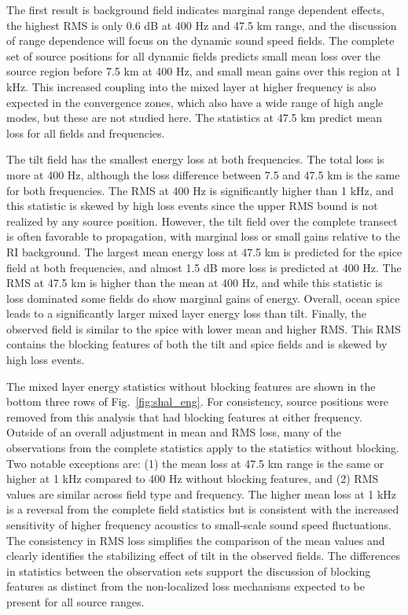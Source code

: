 \documentclass[preprint,NumberedRefs]{JASA}
\begin{document}
The first result is background field indicates marginal range dependent effects, the highest RMS is only 0.6 dB at 400 Hz and 47.5 km range, and the discussion of range dependence will focus on the dynamic sound speed fields. The complete set of source positions for all dynamic fields predicts small mean loss over the source region before 7.5 km at 400 Hz, and small mean gains over this region at 1 kHz. This increased coupling into the mixed layer at higher frequency is also expected in the convergence zones, which also have a wide range of high angle modes, but these are not studied here. The statistics at 47.5 km predict mean loss for all fields and frequencies.

The tilt field has the smallest energy loss at both frequencies. The total loss is more at 400 Hz, although the loss difference between 7.5 and 47.5 km is the same for both frequencies. The RMS at 400 Hz is significantly higher than 1 kHz, and this statistic is skewed by high loss events since the upper RMS bound is not realized by any source position. However, the tilt field over the complete transect is often favorable to propagation, with marginal loss or small gains relative to the RI background. The largest mean energy loss at 47.5 km is predicted for the spice field at both frequencies, and almost 1.5 dB more loss is predicted at 400 Hz. The RMS at 47.5 km is higher than the mean at 400 Hz, and while this statistic is loss dominated some fields do show marginal gains of energy. Overall, ocean spice leads to a significantly larger mixed layer energy loss than tilt. Finally, the observed field is similar to the spice with lower mean and higher RMS. This RMS contains the blocking features of both the tilt and spice fields and is skewed by high loss events.

The mixed layer energy statistics without blocking features are shown in the bottom three rows of Fig.~\ref{fig:shal_eng}. For consistency, source positions were removed from this analysis that had blocking features at either frequency. Outside of an overall adjustment in mean and RMS loss, many of the observations from the complete statistics apply to the statistics without blocking. Two notable exceptions are: (1) the mean loss at 47.5 km range is the same or higher at 1 kHz compared to 400 Hz without blocking features, and (2) RMS values are similar across field type and frequency. The higher mean loss at 1 kHz is a reversal from the complete field statistics but is consistent with the increased sensitivity of higher frequency acoustics to small-scale sound speed fluctuations. The consistency in RMS loss simplifies the comparison of the mean values and clearly identifies the stabilizing effect of tilt in the observed fields. The differences in statistics between the observation sets support the discussion of blocking features as distinct from the non-localized loss mechanisms expected to be present for all source ranges.
\end{document}
